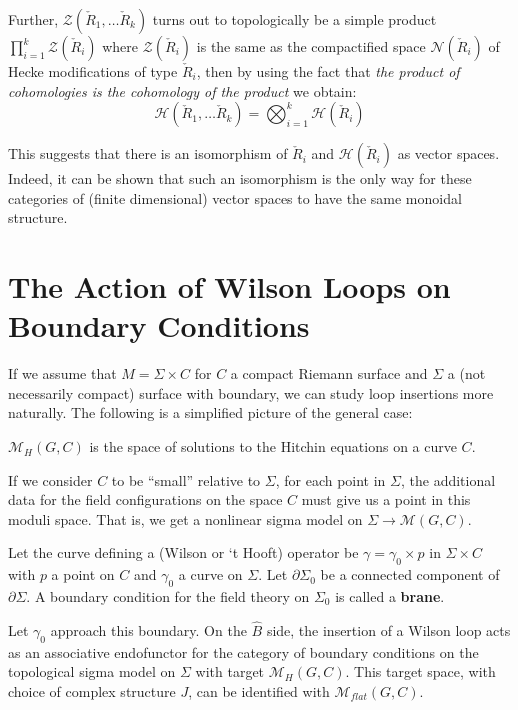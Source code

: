 	Further, $\mathcal Z(\check R_1, \dots \check R_k)$ turns out to topologically be a simple product $\prod_{i=1}^k \mathcal Z(\check R_i)$ where $\mathcal Z(\check R_i)$ is the same as the compactified space $\mathcal N(\check R_i)$ of Hecke modifications of type $\check R_i$, then by using the fact that \emph{the product of cohomologies is the cohomology of the product} we obtain:
	\begin{equation}
		\mathcal H(\check R_1, \dots \check R_k) = \bigotimes_{i=1}^k \mathcal H(\check R_i)
	\end{equation}
	
	This suggests that there is an isomorphism of $\check R_i$ and $\mathcal H(\check R_i)$ as vector spaces. Indeed, it can be shown that such an isomorphism is the only way for these categories of (finite dimensional) vector spaces to have the same monoidal structure.
	
	\section{The Action of Wilson Loops on Boundary Conditions}
	
	If we assume that $M = \Sigma \times C$ for $C$ a compact Riemann surface and $\Sigma$ a (not necessarily compact) surface with boundary, we can study loop insertions more naturally. The following is a simplified picture of the general case:

	\begin{defn}
		$\mathcal M_H (G, C)$ is the space of solutions to the Hitchin equations on a curve $C$. 
	\end{defn}
	If we consider $C$ to be ``small'' relative to $\Sigma$, for each point in $\Sigma$, the additional data for the field configurations on the space $C$ must give us a point in this moduli space. That is, we get a nonlinear sigma model on $\Sigma \to \mathcal M (G, C)$.
	
	Let the curve defining a (Wilson or `t Hooft) operator be $\gamma = \gamma_0 \times p$ in $\Sigma \times C$ with $p$ a point on $C$ and $\gamma_0$ a curve on $\Sigma$. Let $\partial \Sigma_0$ be a connected component of $\partial \Sigma$. A boundary condition for the field theory on $\Sigma_0$ is called a \textbf{brane}.
	
	Let $\gamma_0$ approach this boundary. On the $\hat B$ side, the insertion of a Wilson loop acts as an associative endofunctor for the category of boundary conditions on the topological sigma model on $\Sigma$ with target $\mathcal M_H (G, C)$. This target  space, with choice of complex structure $J$, can be identified with $\mathcal M_{flat} (G, C)$.
	
